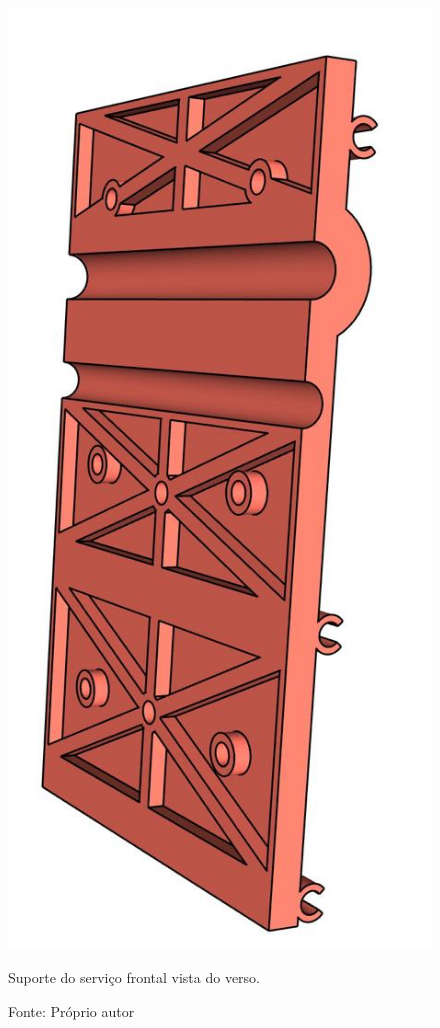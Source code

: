 \begin{figure}[H]
\centering
\includegraphics[scale = 0.4]{figuras/ressuporteservicofrontalfv}
\caption{Suporte do serviço frontal vista do verso.}
\caption*{Fonte: Próprio autor}
\label{fig:ressuporteservicofrontalfv}
\end{figure}

